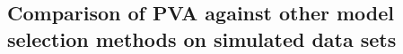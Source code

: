 






\subsection{Comparison of PVA against other model selection methods on
simulated data sets}

